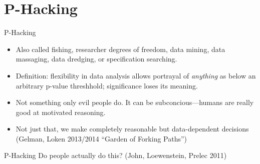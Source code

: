 \documentclass{beamer}
\begin{document}
\section{P-Hacking}
\begin{frame}{P-Hacking}
\begin{itemize}
\item
Also called fishing, researcher degrees of freedom, data mining, data massaging, data dredging, or specification searching.
\item
Definition: flexibility in data analysis allows portrayal of \textit{anything} as below an arbitrary p-value threshhold; significance loses its meaning.
\item
Not something only evil people do. It can be subconcious---humans are really good at motivated reasoning.
\item
Not just that, we make completely reasonable but data-dependent decisions (Gelman, Loken 2013/2014 ``Garden of Forking Paths'')
\end{itemize}
\end{frame}


\begin{frame}{P-Hacking}
Do people actually do this? (John, Loewenstein, Prelec 2011)
\end{frame}
\end{document}
